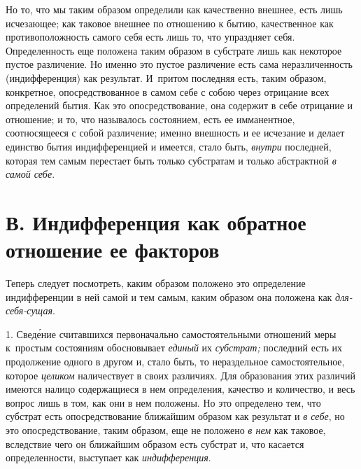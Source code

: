 Но то, что мы таким образом определили как качественно внешнее, есть лишь
исчезающее; как таковое внешнее по отношению к бытию, качественное как
противоположность самого себя есть лишь то, что упраздняет себя. Определенность
еще положена таким образом в субстрате лишь как некоторое пустое различение. Но
именно это пустое различение есть сама неразличенность (индифференция) как
результат. И~притом последняя есть, таким образом, конкретное,
опосредствованное в самом себе с собою через отрицание всех определений бытия.
Как это опосредствование, она содержит в себе отрицание и отношение; и то, что
называлось состоянием, есть ее имманентное, соотносящееся с собой различение;
именно внешность и ее исчезание и делает единство бытия индифференцией и
имеется, стало быть, {\em внутри} последней, которая тем самым перестает быть
только субстратам и только абстрактной {\em в самой себе}.

\section[В. Индифференция как обратное отношение ее факторов]%
{В. Индифференция как обратное отношение
ее факторов}

Теперь следует посмотреть, каким образом положено это определение индифференции
в ней самой и тем самым, каким образом она положена как {\em для-себя-сущая}.

1. Свед\'{е}ние считавшихся первоначально самостоятельными отношений меры
к~простым состояниям обосновывает {\em единый} их {\em субстрат;} последний
есть их продолжение одного в другом и, стало быть, то нераздельное
самостоятельное, которое {\em целиком} наличествует в своих различиях. Для
образования этих различий имеются налицо содержащиеся в нем определения,
качество и количество, и весь вопрос лишь в том, как они в нем положены. Но это
определено тем, что субстрат есть опосредствование ближайшим образом как
результат и {\em в себе}, но это опосредствование, таким образом, еще не
положено {\em в нем} как таковое, вследствие чего он ближайшим образом есть
субстрат и, что касается определенности, выступает как {\em индифференция}.

